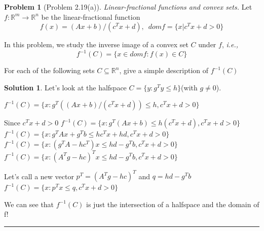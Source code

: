 \documentclass{article}
\theoremstyle{definition}
\newtheorem{problem}{Problem}
\def\fline{\rule{0.75\linewidth}{0.5pt}}
\newcommand{\finishline}{\begin{center}\fline\end{center}}
\newtheorem*{solution*}{Solution}
\newenvironment{solution}{\begin{solution*}}{{\finishline} \end{solution*}}
\begin{document}
\begin{problem} [Problem 2.19(a)]
    \textit{Linear-fractional functions and convex sets.} Let $f: \mathbb{R}^m \rightarrow \mathbb{R}^n$ be the linear-fractional function
    \begin{equation}
        f(x) = (Ax + b) / (c^Tx + d), \enspace dom f = \{x | c^Tx + d > 0\}
    \end{equation}

    In this problem, we study the inverse image of a convex set $C$ under $f$, \textit{i.e.,}
    \begin{equation}
        f^{-1}(C) = \{x \in dom f : f(x) \in C\}
    \end{equation}

    For each of the following sets $C \subseteq \mathbb{R}^n $, give a simple description of $f^{-1}(C)$

    \begin{solution}
        Let's look at the halfspace $C = \{y : g^Ty \leq h\}$(with $g\neq 0$). 

        $f^{-1}(C) = \{x :  g^T ((Ax + b) / (c^Tx + d)) \leq h, c^Tx + d > 0 \}$ \newline 

        Since $c^Tx + d > 0$ \newline 
        $f^{-1}(C) = \{ x :  g^T (Ax + b) \leq h(c^Tx + d), c^Tx + d > 0 \}$ \newline 
        $f^{-1}(C) = \{ x :  g^TAx + g^Tb \leq hc^Tx + hd, c^Tx + d > 0 \}$ \newline
        $f^{-1}(C) = \{ x :  (g^TA - hc^T)x \leq hd - g^Tb, c^Tx + d > 0 \}$ \newline
        $f^{-1}(C) = \{ x :  (A^Tg - hc)^T x \leq hd - g^Tb, c^Tx + d > 0 \}$ \newline

        Let's call a new vector $p^T = (A^Tg - hc)^T$ and $q = hd - g^Tb$ \newline 
        $f^{-1}(C) = \{ x :  p^T x \leq q, c^Tx + d > 0 \}$ \newline

        We can see that $f^{-1}(C)$ is just the intersection of a halfspace and the domain of f!
    \end{solution}
\end{problem}
\end{document}
